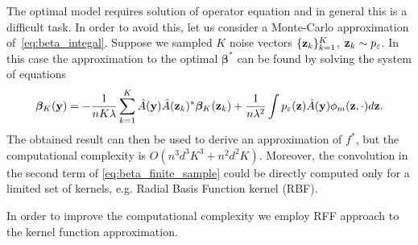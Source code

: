 The optimal model requires solution of operator equation and in general
this is a difficult task.
In order to avoid this, let us consider a Monte-Carlo approximation
of~\eqref{eq:beta_integal}.
Suppose we sampled $K$ noise vectors $\{{\bf z}_k\}_{k = 1}^K$,
${\bf z}_k \sim p_{\varepsilon}$.
In this case the approximation to the optimal ${\bm \beta}^*$ can be found
by solving the system of equations
\begin{equation}
    \label{eq:beta_finite_sample}
    {\bm \beta}_K({\bf y}) = -\frac{1}{nK\lambda}
    \sum\limits_{k = 1}^K
    \hat{A}({\bf y})\hat{A}({\bf z}_k)^*{\bm \beta}_K({\bf z}_k)
    + \frac{1}{n\lambda^2}\int p_{\varepsilon}({\bf z}) \hat{A}({\bf y}) \phi_m({\bf z}, \cdot)d{\bf z}.
\end{equation}
The obtained result can then be used to derive an approximation of $f^*$,
but the computational complexity is $O(n^3d^3K^3 + n^2d^2K)$.
Moreover, the convolution in the second term of \eqref{eq:beta_finite_sample} could be directly computed
only for a limited set of kernels, e.g. Radial Basis Function kernel (RBF).

In order to improve the computational complexity we employ RFF approach
to the kernel function approximation.

